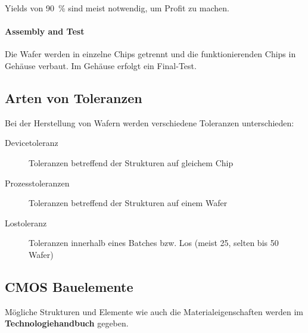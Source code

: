 Yields von \qty{90}{\percent} sind meist notwendig, um Profit zu machen.

\paragraph{Assembly and Test}
Die Wafer werden in einzelne Chips getrennt und die funktionierenden Chips in Gehäuse verbaut. Im Gehäuse erfolgt ein Final-Test.


\subsection{Arten von Toleranzen}
Bei der Herstellung von Wafern werden verschiedene Toleranzen unterschieden:
\begin{description}
    \item[Devicetoleranz] Toleranzen betreffend der Strukturen auf gleichem Chip
    \item[Prozesstoleranzen] Toleranzen betreffend der Strukturen auf einem Wafer
    \item[Lostoleranz] Toleranzen innerhalb eines Batches bzw. Los (meist 25, selten bis 50 Wafer)
\end{description}

\subsection{CMOS Bauelemente}
Mögliche Strukturen und Elemente wie auch die Materialeigenschaften werden im \textbf{Technologiehandbuch} gegeben.

%     

%     

